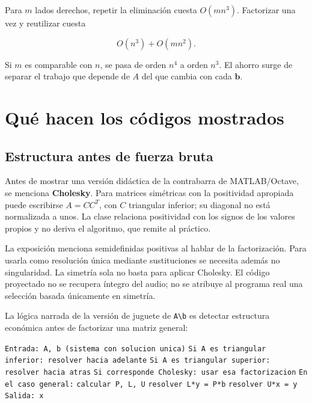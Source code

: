 \documentclass[12pt,a4paper]{article}
\begin{document}

Para $m$ lados derechos, repetir la eliminación cuesta $O(mn^3)$. Factorizar una vez y reutilizar cuesta

\[
\boxed{O(n^3)+O(mn^2)}.
\]

Si $m$ es comparable con $n$, se pasa de orden $n^4$ a orden $n^3$. El ahorro surge de separar el trabajo que depende de $A$ del que cambia con cada $\mathbf b$.

\section{Qué hacen los códigos mostrados}

\subsection{Estructura antes de fuerza bruta}

Antes de mostrar una versión didáctica de la contrabarra de MATLAB/Octave, se menciona \textbf{Cholesky}. Para matrices simétricas con la positividad apropiada puede escribirse $A=CC^T$, con $C$ triangular inferior; su diagonal no está normalizada a unos. La clase relaciona positividad con los signos de los valores propios y no deriva el algoritmo, que remite al práctico.

\begin{notebox}
La exposición menciona semidefinidas positivas al hablar de la factorización. Para usarla como resolución única mediante sustituciones se necesita además no singularidad. La simetría sola no basta para aplicar Cholesky. El código proyectado no se recupera íntegro del audio; no se atribuye al programa real una selección basada únicamente en simetría.
\end{notebox}

La lógica narrada de la versión de juguete de \texttt{A\textbackslash{}b} es detectar estructura económica antes de factorizar una matriz general:

\begin{algorithm}[H]
\small\DontPrintSemicolon
\hspace*{0.0em}\texttt{Entrada: A, b (sistema con solucion unica)}\;
\hspace*{0.0em}\texttt{Si A es triangular inferior: resolver hacia adelante}\;
\hspace*{0.0em}\texttt{Si A es triangular superior: resolver hacia atras}\;
\hspace*{0.0em}\texttt{Si corresponde Cholesky: usar esa factorizacion}\;
\hspace*{0.0em}\texttt{En el caso general:}\;
\hspace*{0.7em}\texttt{calcular P, L, U}\;
\hspace*{0.7em}\texttt{resolver L*y = P*b}\;
\hspace*{0.7em}\texttt{resolver U*x = y}\;
\hspace*{0.0em}\texttt{Salida: x}\;
\end{algorithm}
\end{document}
